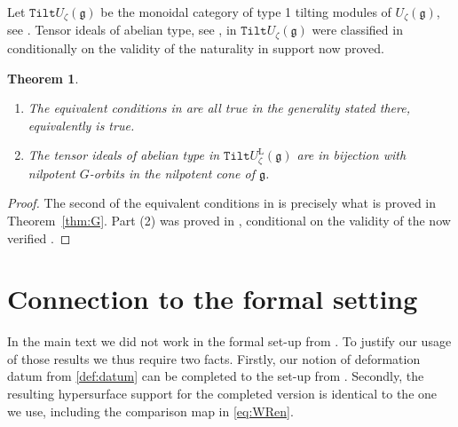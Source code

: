 \documentclass{amsart}
\numberwithin{equation}{section}
\newtheorem{theorem}[subsubsection]{Theorem}
\theoremstyle{definition}
\theoremstyle{remark}
\newcommand{\Tilt}{\mathtt{Tilt}}
\newcommand{\fg}{\mathfrak{g}}
\renewcommand{\L}{\mathrm{L}}
\begin{document}
Let $\Tilt U_\zeta(\fg)$ be the monoidal category of type 1 tilting modules of $U_\zeta(\fg)$, see \cite{An}. Tensor ideals of abelian type, see \cite[Definition~2.1.1]{CEO}, in $\Tilt U_\zeta(\fg)$ were classified in  \cite[Theorem~5.4.3]{CEO} conditionally on the validity of the naturality in support now proved.


\begin{theorem}
\begin{enumerate}
\item The equivalent conditions in \cite[Proposition~5.3.1]{CEO} are all true in the generality stated there, equivalently \cite[Conjecture~5.3.3]{CEO} is true.
\item The tensor ideals of abelian type in $\Tilt U_\zeta^{\L}(\fg)$ are in bijection with nilpotent $G$-orbits in the nilpotent cone of $\fg$.
\end{enumerate}
\end{theorem}
\begin{proof}
The second of the equivalent conditions in \cite[Proposition~5.3.1]{CEO} is precisely what is proved in Theorem~\ref{thm:G}.
Part (2) was proved in \cite[Theorem~5.4.3]{CEO}, conditional on the validity of the now verified \cite[Conjecture~5.3.3]{CEO}.
\end{proof}




\appendix


\section{Connection to the formal setting}\label{sec:app}

In the main text we did not work in the formal set-up from \cite{NP1, NP2}. To justify our usage of those results we thus require two facts. Firstly, our notion of deformation datum from \ref{def:datum} can be completed to the set-up from \cite[\S 2.1- 2.2]{NP1}. Secondly, the resulting hypersurface support for the completed version is identical to the one we use, including the comparison map in \eqref{eq:WRen}.
\end{document}
